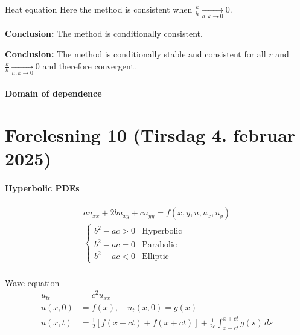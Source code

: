 \begin{example}{Heat equation}{}
  Here the method is consistent when \(\frac{k}{h} \underset{h,k \to 0}{\longrightarrow} 0\).

  \textbf{Conclusion:} The method is conditionally consistent.

  \textbf{Conclusion:} The method is conditionally stable and consistent for all \( r \) and \( \frac{k}{h} \underset{h,k \to 0}{\longrightarrow} 0 \) and therefore convergent.

\end{example}

\paragraph{Domain of dependence}

\section{Forelesning 10 (Tirsdag 4. februar 2025)}

\paragraph{Hyperbolic PDEs}

\begin{align*}\label{eq:hb1}
  a u_{xx} + 2bu_{xy} + c u_{yy} = f(x,y, u, u_x, u_y) \tag{1} \\
  \begin{cases}
    b^2 - ac > 0 & \text{Hyperbolic} \\
    b^2 - ac = 0 & \text{Parabolic}  \\
    b^2 - ac < 0 & \text{Elliptic}
  \end{cases}                             \\
\end{align*}

\begin{example}{Wave equation}{}
  \begin{align*}
    u_{tt} & = c^2 u_{xx}                                                                                   \\
    u(x,0) & = f(x), \quad u_t(x,0) = g(x)                                                                  \\
    u(x,t) & = \frac{1}{2}\left[ f(x - ct) + f(x + ct) \right] + \frac{1}{2c} \int_{x-ct}^{x+ct} g(s) \, ds
  \end{align*}
\end{example}

